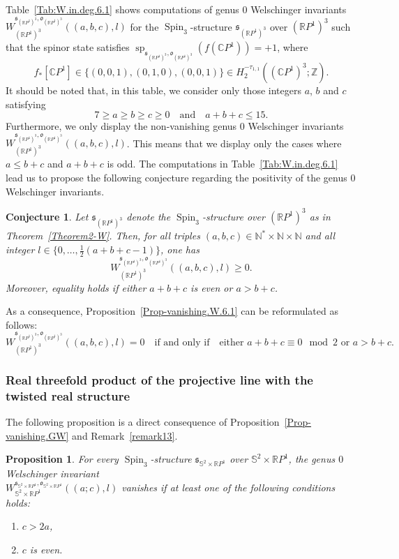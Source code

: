 \documentclass[11pt]{amsart}
\numberwithin{equation}{section}
\theoremstyle{definition}
\theoremstyle{plain}
\newtheorem{proposition}[definition]{Proposition}
\newtheorem{conjecture}{Conjecture}
\theoremstyle{remark}
\newcommand{\R}{\mathbb{R}}
\newcommand{\Z}{\mathbb{Z}}
\newcommand{\C}{\mathbb{C}}
\DeclareMathOperator{\Spin}{Spin}
\renewcommand{\sp}{\operatorname{sp}}
\begin{document}
Table~\ref{Tab:W.in.deg.6.1} shows computations of  genus $0$ Welschinger invariants $W_{(\R P^1)^3}^{\mathfrak{s}_{(\R P^1)^3},\mathfrak{o}_{(\R P^1)^3}}((a,b,c),l)$ for the $\Spin_3$-structure $\mathfrak{s}_{(\R P^1)^3}$ over $(\R P^1)^3$  such that the spinor state satisfies $\sp_{\mathfrak{s}_{(\R P^1)^3},\mathfrak{o}_{(\R P^1)^3}}(f(\C P^1))=+1$, where
$$f_*\left[\C P^1\right]\in \{(0,0,1),(0,1,0),(0,0,1)\}\in H_2^{-\tau_{1,1}}\left(\left(\C P^1\right)^3;\Z\right).$$ 
         It should be noted that, in this table, we consider only those integers $a$, $b$ and $c$ satisfying $$7 \geq a \geq b \geq c \geq 0 \quad\text{and}\quad a + b + c \leq 15.$$ Furthermore, we only display the non-vanishing genus $0$ Welschinger invariants $W_{(\R P^1)^3}^{\mathfrak{s}_{(\R P^1)^3},\mathfrak{o}_{(\R P^1)^3}}((a,b,c),l)$. This means that  we display only the cases where $a\leq b+c$ and $a+b+c$ is odd. 
       The computations in Table~\ref{Tab:W.in.deg.6.1}  lead us to propose the following conjecture regarding the positivity of the genus $0$ Welschinger invariants.

       \begin{conjecture}
     Let $\mathfrak{s}_{(\R P^1)^3}$ denote the $\Spin_3$-structure over $(\R P^1)^3$ as in Theorem~\ref{Theorem2-W}.
Then, for all triples $(a,b,c)\in \mathbb{N}^*\times  \mathbb{N}\times \mathbb{N}$ and all integer $l \in \{0,\ldots, \frac{1}{2}(a+b+c-1)\}$, one has
     $$W_{(\R P^1)^3}^{\mathfrak{s}_{(\R P^1)^3},\mathfrak{o}_{(\R P^1)^3}}((a,b,c),l)\geq  0.$$ 
     Moreover,  equality holds if either $a+b+c$ is even or $a>b+c$.
 \end{conjecture}

       As a consequence, Proposition~\ref{Prop-vanishing.W.6.1} can be reformulated as follows:
  $$W_{(\R P^1)^3}^{\mathfrak{s}_{(\R P^1)^3},\mathfrak{o}_{(\R P^1)^3}}((a,b,c),l) = 0 \quad\text{if and only if}\quad\text{either } a+b+c \equiv 0 \mod 2 \text{ or } a>b+c.$$ 


\subsubsection{Real threefold product of the projective line with the twisted real structure}
The following proposition is a direct consequence of Proposition~\ref{Prop-vanishing.GW} and Remark~\ref{remark13}.  

\begin{proposition}\label{Prop-vanishing.W.6.2}
 For every $\Spin_3$-structure $\mathfrak{s}_{\mathbb{S}^2\times\R P^1}$ over $\mathbb{S}^2\times \R P^1$, the genus $0$ Welschinger invariant\\
$ W_{\mathbb{S}^2 \times \R P^1}^{\mathfrak{s}_{\mathbb{S}^2 \times \R P^1},\mathfrak{o}_{\mathbb{S}^2 \times \R P^1}}((a;c),l)$ vanishes if at least one of the following conditions holds:
    \begin{enumerate}
        \item $c>2a$,
        \item $c$ is even.
            \end{enumerate}
\end{proposition}
\end{document}

